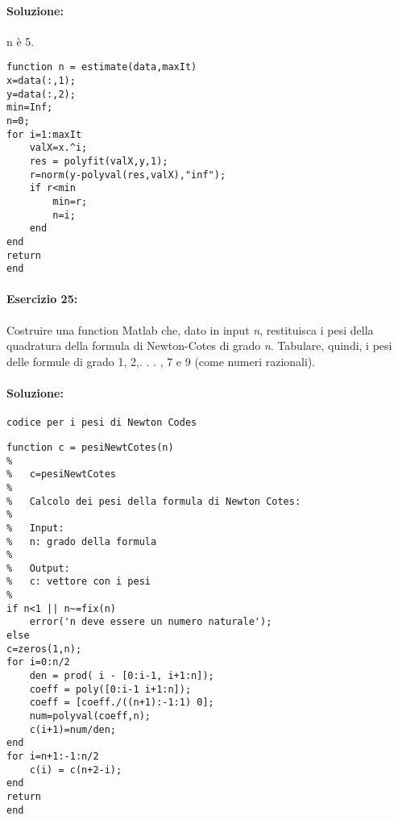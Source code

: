 \documentclass[12pt]{article}
\begin{document}
\paragraph{Soluzione:}
n è 5.
\begin{lstlisting}[frame=single]
function n = estimate(data,maxIt)
x=data(:,1);
y=data(:,2);
min=Inf;
n=0;
for i=1:maxIt
    valX=x.^i;
    res = polyfit(valX,y,1);
    r=norm(y-polyval(res,valX),"inf");
    if r<min
        min=r;
        n=i;
    end
end
return
end
\end{lstlisting}

\paragraph{Esercizio 25:}
Costruire una function Matlab che, dato in input \emph{n}, restituisca i pesi della quadratura della formula di Newton-Cotes di grado \emph{n}. Tabulare, quindi, i pesi delle formule di grado
1, 2,. . . , 7 e 9 (come numeri razionali).


\paragraph{Soluzione:}

\texttt{codice per i pesi di Newton Codes}
\begin{lstlisting}[frame=single]
function c = pesiNewtCotes(n)
%
%   c=pesiNewtCotes
%
%   Calcolo dei pesi della formula di Newton Cotes:
%
%   Input:
%   n: grado della formula
%
%   Output:
%   c: vettore con i pesi
%
if n<1 || n~=fix(n)
    error('n deve essere un numero naturale');
else
c=zeros(1,n);
for i=0:n/2
    den = prod( i - [0:i-1, i+1:n]);
    coeff = poly([0:i-1 i+1:n]);
    coeff = [coeff./((n+1):-1:1) 0];
    num=polyval(coeff,n);
    c(i+1)=num/den;
end
for i=n+1:-1:n/2
    c(i) = c(n+2-i);
end
return
end
\end{lstlisting}
\end{document}
